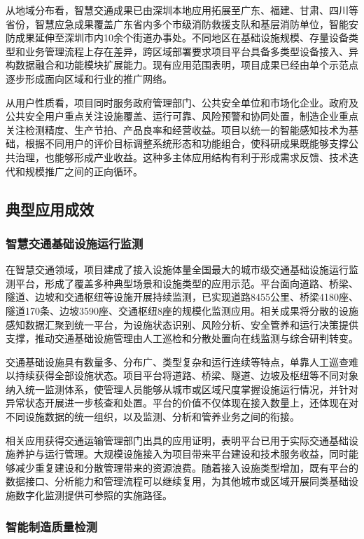 从地域分布看，智慧交通成果已由深圳本地应用拓展至广东、福建、甘肃、四川等省份，智慧应急成果覆盖广东省内多个市级消防救援支队和基层消防单位，智能安防成果延伸至深圳市内10余个街道办事处。不同地区在基础设施规模、存量设备类型和业务管理流程上存在差异，跨区域部署要求项目平台具备多类型设备接入、异构数据融合和功能模块扩展能力。现有应用范围表明，项目成果已经由单个示范点逐步形成面向区域和行业的推广网络。

从用户性质看，项目同时服务政府管理部门、公共安全单位和市场化企业。政府及公共安全用户重点关注设施覆盖、运行可靠、风险预警和协同处置，制造企业重点关注检测精度、生产节拍、产品良率和经营收益。项目以统一的智能感知技术为基础，根据不同用户的评价目标调整系统形态和功能组合，使科研成果既能够支撑公共治理，也能够形成产业收益。这种多主体应用结构有利于形成需求反馈、技术迭代和规模推广之间的正向循环。

\subsection{典型应用成效}

\subsubsection{智慧交通基础设施运行监测}

在智慧交通领域，项目建成了接入设施体量全国最大的城市级交通基础设施运行监测平台，形成了覆盖多种典型场景和设施类型的应用示范。平台面向道路、桥梁、隧道、边坡和交通枢纽等设施开展持续监测，已实现道路8455公里、桥梁4180座、隧道170条、边坡3590座、交通枢纽8座的规模化监测应用。相关成果将分散的设施感知数据汇聚到统一平台，为设施状态识别、风险分析、安全管养和运行决策提供支撑，推动交通基础设施管理由人工巡检和分散处置向在线监测与综合研判转变。

交通基础设施具有数量多、分布广、类型复杂和运行连续等特点，单靠人工巡查难以持续获得全部设施状态。项目平台将道路、桥梁、隧道、边坡及枢纽等不同对象纳入统一监测体系，使管理人员能够从城市或区域尺度掌握设施运行情况，并针对异常状态开展进一步核查和处置。平台的价值不仅体现在接入数量上，还体现在对不同设施数据的统一组织，以及监测、分析和管养业务之间的衔接。

相关应用获得交通运输管理部门出具的应用证明，表明平台已用于实际交通基础设施养护与运行管理。大规模设施接入为项目带来平台建设和技术服务收益，同时能够减少重复建设和分散管理带来的资源浪费。随着接入设施类型增加，既有平台的数据接口、分析能力和管理流程可以继续复用，为其他城市或区域开展同类基础设施数字化监测提供可参照的实施路径。

\subsubsection{智能制造质量检测}

